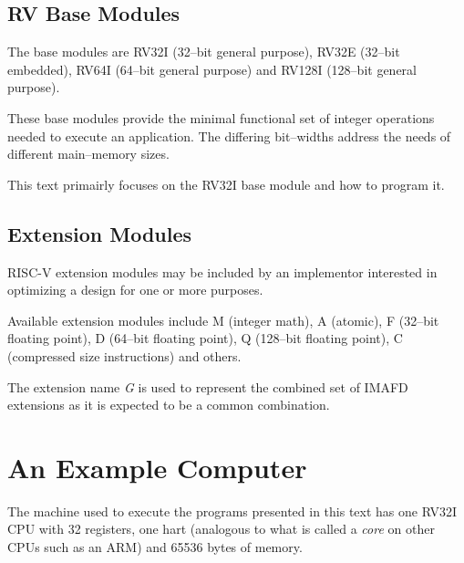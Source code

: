 \subsection{RV Base Modules}
The base modules are RV32I (32--bit general purpose), 
RV32E (32--bit embedded), RV64I (64--bit general purpose) 
and RV128I (128--bit general purpose).

These base modules provide the minimal functional set of integer operations
needed to execute an application.  The differing bit--widths address
the needs of different main--memory sizes.

This text primairly focuses on the RV32I base module and how to program it.


\subsection{Extension Modules}

RISC-V extension modules may be included by an implementor interested
in optimizing a design for one or more purposes.

Available extension modules include M (integer math), A (atomic),
F (32--bit floating point), D (64--bit floating point), 
Q (128--bit floating point), C (compressed size instructions) and others.

The extension name {\em G} is used to represent the combined set of IMAFD
extensions as it is expected to be a common combination.



\section{An Example Computer}

%
The machine used to execute the programs presented in this text
has one RV32I CPU with 32 registers, one \acrshort{hart} 
(analogous to what is called a {\em core} on other CPUs such as an ARM)
and 65536 bytes of memory.  



